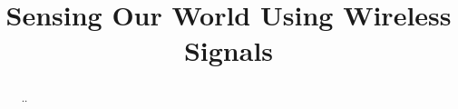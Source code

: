 \documentclass[conference]{IEEEtran}
\begin{document}
%
\title{Sensing Our World Using Wireless Signals}


\author{}

\maketitle

\begin{abstract}
..
\end{abstract}


\IEEEpeerreviewmaketitle










\footnotesize


\end{document}
